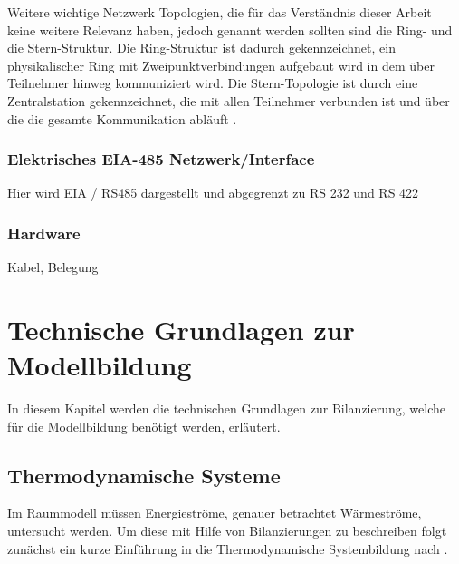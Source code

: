 Weitere wichtige Netzwerk Topologien, die für das Verständnis dieser Arbeit keine weitere Relevanz haben, jedoch genannt werden sollten sind die Ring- und die Stern-Struktur. Die Ring-Struktur ist dadurch gekennzeichnet, ein physikalischer Ring mit Zweipunktverbindungen aufgebaut wird in dem über Teilnehmer hinweg kommuniziert wird. Die Stern-Topologie ist durch eine Zentralstation gekennzeichnet, die mit allen Teilnehmer verbunden ist und über die die gesamte Kommunikation abläuft \cite[S.~6f.]{schn06}.



\subsubsection{Elektrisches EIA-485 Netzwerk/Interface}
Hier wird EIA / RS485 dargestellt und abgegrenzt zu RS 232 und RS 422

\subsubsection{Hardware}
Kabel, Belegung







\section{Technische Grundlagen zur Modellbildung}
\label{sec:grundlagenmodell}
In diesem Kapitel werden die technischen Grundlagen zur Bilanzierung, welche für die Modellbildung benötigt werden, erläutert.

\subsection{Thermodynamische Systeme}
Im Raummodell müssen Energieströme, genauer betrachtet Wärmeströme, untersucht werden. Um diese mit Hilfe von Bilanzierungen zu beschreiben folgt zunächst ein kurze Einführung in die Thermodynamische Systembildung nach \cite[S.~11ff.]{ba12}.


